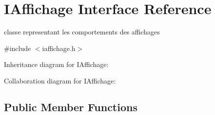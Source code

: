 \hypertarget{class_i_affichage}{}\section{I\+Affichage Interface Reference}
\label{class_i_affichage}


classe representant les comportements des affichages  




{\ttfamily \#include $<$iaffichage.\+h$>$}



Inheritance diagram for I\+Affichage\+:


Collaboration diagram for I\+Affichage\+:
\subsection*{Public Member Functions}

